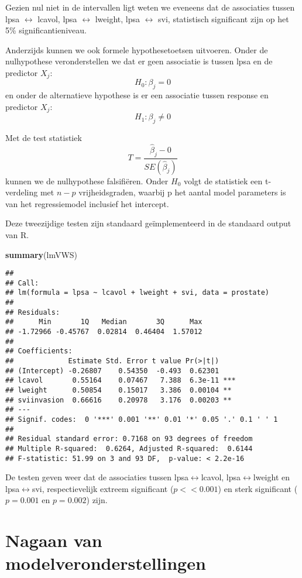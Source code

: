\documentclass[12pt,dutch,coursenotes]{book}
\newenvironment{Shaded}{\begin{snugshade}}{\end{snugshade}}
\newcommand{\KeywordTok}[1]{\textcolor[rgb]{0.13,0.29,0.53}{\textbf{#1}}}
\newcommand{\NormalTok}[1]{#1}
\theoremstyle{definition}
\theoremstyle{definition}
\theoremstyle{definition}
\theoremstyle{remark}
\begin{document}
Gezien nul niet in de intervallen ligt weten we eveneens dat de
associaties tussen lpsa \(\leftrightarrow\) lcavol, lpsa
\(\leftrightarrow\) lweight, lpsa \(\leftrightarrow\) svi, statistisch
significant zijn op het 5\% significantieniveau.

Anderzijds kunnen we ook formele hypothesetoetsen uitvoeren. Onder de
nulhypothese veronderstellen we dat er geen associatie is tussen lpsa en
de predictor \(X_j\): \[H_0: \beta_j=0\] en onder de alternatieve
hypothese is er een associatie tussen response en predictor \(X_j\):
\[H_1: \beta_j\neq0\]

Met de test statistiek \[T=\frac{\hat{\beta}_j-0}{SE(\hat{\beta}_j)}\]
kunnen we de nulhypothese falsifiëren. Onder \(H_0\) volgt de statistiek
een t-verdeling met \(n-p\) vrijheidsgraden, waarbij p het aantal model
parameters is van het regressiemodel inclusief het intercept.

Deze tweezijdige testen zijn standaard geïmplementeerd in de standaard
output van R.

\begin{Shaded}
\begin{Highlighting}[]
\KeywordTok{summary}\NormalTok{(lmVWS)}
\end{Highlighting}
\end{Shaded}

\begin{verbatim}
## 
## Call:
## lm(formula = lpsa ~ lcavol + lweight + svi, data = prostate)
## 
## Residuals:
##      Min       1Q   Median       3Q      Max 
## -1.72966 -0.45767  0.02814  0.46404  1.57012 
## 
## Coefficients:
##             Estimate Std. Error t value Pr(>|t|)    
## (Intercept) -0.26807    0.54350  -0.493  0.62301    
## lcavol       0.55164    0.07467   7.388  6.3e-11 ***
## lweight      0.50854    0.15017   3.386  0.00104 ** 
## sviinvasion  0.66616    0.20978   3.176  0.00203 ** 
## ---
## Signif. codes:  0 '***' 0.001 '**' 0.01 '*' 0.05 '.' 0.1 ' ' 1
## 
## Residual standard error: 0.7168 on 93 degrees of freedom
## Multiple R-squared:  0.6264, Adjusted R-squared:  0.6144 
## F-statistic: 51.99 on 3 and 93 DF,  p-value: < 2.2e-16
\end{verbatim}

De testen geven weer dat de associaties tussen
lpsa\(\leftrightarrow\)lcavol, lpsa\(\leftrightarrow\)lweight en
lpsa\(\leftrightarrow\)svi, respectievelijk extreem significant
(\(p << 0.001\)) en sterk significant (\(p=0.001\) en \(p=0.002\)) zijn.

\section{Nagaan van
modelveronderstellingen}\label{nagaan-van-modelveronderstellingen-1}
\end{document}
